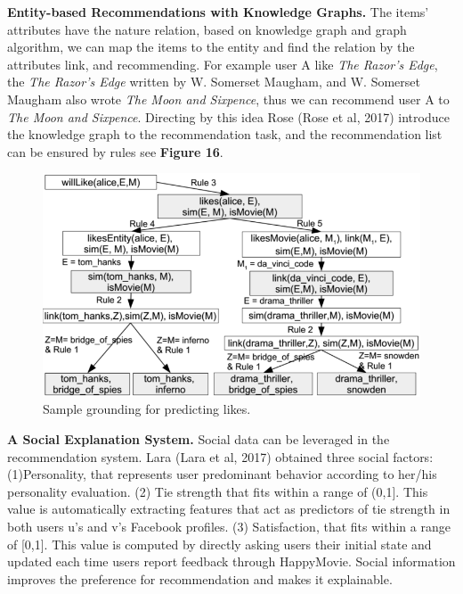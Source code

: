 \documentclass[10pt,twocolumn,letterpaper]{article}
\begin{document}
{\bf Entity-based Recommendations with Knowledge Graphs.} The items' attributes have the nature relation, based on knowledge graph and graph algorithm, we can map the items to the entity and find the relation by the attributes link, and recommending. For example user A like {\em The Razor's Edge}, the {\em The Razor's Edge} written by W. Somerset Maugham, and W. Somerset Maugham also wrote {\em The Moon and Sixpence}, thus we can recommend user A to {\em The Moon and Sixpence}. Directing by this idea Rose (Rose et al, 2017) introduce the knowledge graph to the recommendation task, and the recommendation list can be ensured by rules see {\bf Figure 16}.
\begin{figure}
	\begin{center}
		\includegraphics[width=0.8\linewidth]{KG.png}
	\end{center}
	\caption{Sample grounding for predicting likes.}
	\label{fig:long}
	\label{fig:onecol}
\end{figure}

{\bf A Social Explanation System.} Social data can be leveraged in the recommendation system. Lara (Lara et al, 2017) obtained three social factors: (1)Personality, that represents user predominant behavior according to her/his personality evaluation. (2) Tie strength that fits within a range of (0,1]. This value is automatically extracting features that act as predictors of tie strength in both users u’s and v’s Facebook profiles. (3) Satisfaction, that fits within a range of [0,1]. This value is computed by directly asking users their initial state and updated each time users report feedback through HappyMovie. Social information improves the preference for recommendation and makes it explainable.
\end{document}

